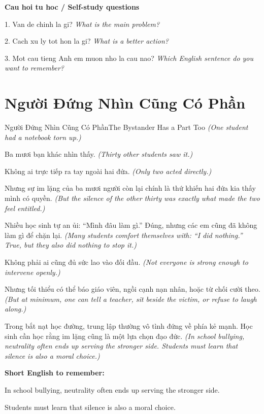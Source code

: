 \begin{tuhocnhanh}
\textbf{Cau hoi tu hoc / Self-study questions}

1. Van de chinh la gi? \textit{What is the main problem?}

2. Cach xu ly tot hon la gi? \textit{What is a better action?}

3. Mot cau tieng Anh em muon nho la cau nao? \textit{Which English sentence do you want to remember?}
\end{tuhocnhanh}
\ngancach

\section{Người Đứng Nhìn Cũng Có Phần}
\begin{truyen}{Người Đứng Nhìn Cũng Có Phần}{The Bystander Has a Part Too}
\textit{(One student had a notebook torn up.)}

Ba mươi bạn khác nhìn thấy.
\textit{(Thirty other students saw it.)}

Không ai trực tiếp ra tay ngoài hai đứa.
\textit{(Only two acted directly.)}

Nhưng sự im lặng của ba mươi người còn lại chính là thứ khiến hai đứa kia thấy mình có quyền.
\textit{(But the silence of the other thirty was exactly what made the two feel entitled.)}

Nhiều học sinh tự an ủi: ``Mình đâu làm gì.'' Đúng, nhưng các em cũng đã không làm gì để chặn lại.
\textit{(Many students comfort themselves with: ``I did nothing.'' True, but they also did nothing to stop it.)}

Không phải ai cũng đủ sức lao vào đối đầu.
\textit{(Not everyone is strong enough to intervene openly.)}

Nhưng tối thiểu có thể báo giáo viên, ngồi cạnh nạn nhân, hoặc từ chối cười theo.
\textit{(But at minimum, one can tell a teacher, sit beside the victim, or refuse to laugh along.)}

\end{truyen}

\begin{baihoc}
Trong bắt nạt học đường, trung lập thường vô tình đứng về phía kẻ mạnh. Học sinh cần học rằng im lặng cũng là một lựa chọn đạo đức.
\textit{(In school bullying, neutrality often ends up serving the stronger side. Students must learn that silence is also a moral choice.)}
\end{baihoc}

\begin{ghinhoanh}
\textbf{Short English to remember:}

In school bullying, neutrality often ends up serving the stronger side.

Students must learn that silence is also a moral choice.

\end{ghinhoanh}


